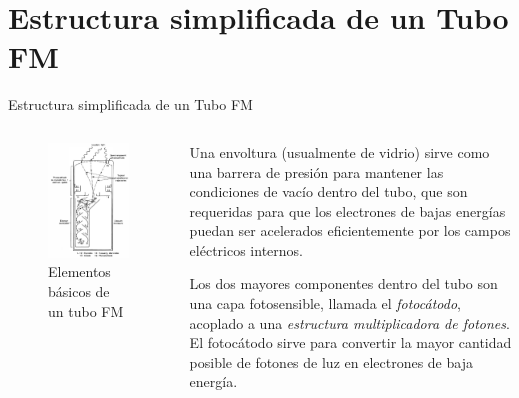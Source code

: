 \documentclass[a4paper,10pt]{beamer}
\begin{document}
\section{Estructura simplificada de un Tubo FM}
\begin{frame}{Estructura simplificada de un Tubo FM}
 
 \begin{columns}[c]
  \column{1in}
  \begin{figure}
  \center
   \includegraphics[scale=0.25]{fig2}
   \caption{Elementos básicos de un tubo FM}
  \end{figure}

  \column{2.5in}
  \begin{justify}
   
   \small{Una envoltura (usualmente de vidrio) sirve como una barrera de presión
   para mantener las condiciones de vacío dentro del tubo, que son requeridas
   para que los electrones de bajas energías puedan ser acelerados eficientemente
   por los campos eléctricos internos.
   
   \vspace{.3cm}
   
   Los dos mayores componentes dentro del tubo son una capa fotosensible, llamada
   el \emph{fotocátodo}, acoplado a una \emph{estructura multiplicadora de fotones}.
   El fotocátodo sirve para convertir la mayor cantidad posible de fotones de luz
   en electrones de baja energía.
   
}
\end{justify}
\end{columns}
\end{frame}
\end{document}
